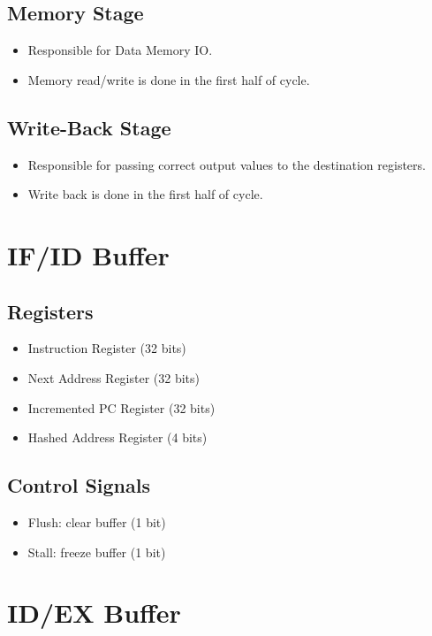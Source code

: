\documentclass[12pt]{report}
\begin{document}
\subsection{Memory Stage}
\begin{itemize}
    \item Responsible for Data Memory IO.
    \item Memory read/write is done in the first half of cycle.
\end{itemize}

\subsection{Write-Back Stage}
\begin{itemize}
    \item Responsible for passing correct output values to the destination registers.
    \item Write back is done in the first half of cycle.
\end{itemize}

\section{IF/ID Buffer}

\subsection{Registers}
\begin{itemize}
    \item Instruction Register (32 bits)
    \item Next Address Register (32 bits)
    \item Incremented PC Register (32 bits)
    \item Hashed Address Register (4 bits)
\end{itemize}

\subsection{Control Signals}
\begin{itemize}
    \item Flush: clear buffer (1 bit)
    \item Stall: freeze buffer (1 bit)
\end{itemize}

\section{ID/EX Buffer}
\end{document}
